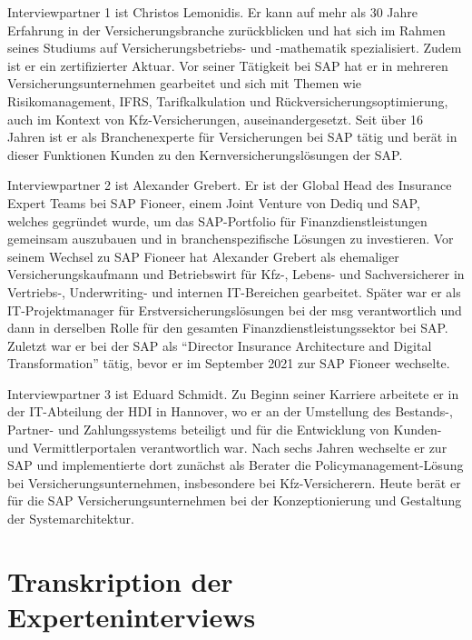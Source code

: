 Interviewpartner 1 ist Christos Lemonidis. Er kann auf mehr als 30 Jahre Erfahrung in der Versicherungsbranche zurückblicken und hat sich im Rahmen seines Studiums auf Versicherungsbetriebs- und -mathematik spezialisiert. Zudem ist er ein zertifizierter Aktuar. Vor seiner Tätigkeit bei SAP hat er in mehreren Versicherungsunternehmen gearbeitet und sich mit Themen wie Risikomanagement, IFRS, Tarifkalkulation und Rückversicherungsoptimierung, auch im Kontext von Kfz-Versicherungen, auseinandergesetzt. Seit über 16 Jahren ist er als Branchenexperte für Versicherungen bei SAP tätig und berät in dieser Funktionen Kunden zu den Kernversicherungslösungen der SAP.  

Interviewpartner 2 ist Alexander Grebert. Er ist der Global Head des Insurance Expert Teams bei SAP Fioneer, einem Joint Venture von Dediq und SAP, welches gegründet wurde, um das SAP-Portfolio für Finanzdienstleistungen gemeinsam auszubauen und in branchenspezifische Lösungen zu investieren. Vor seinem Wechsel zu SAP Fioneer hat Alexander Grebert als ehemaliger Versicherungskaufmann und Betriebswirt für Kfz-, Lebens- und Sachversicherer in Vertriebs-, Underwriting- und internen IT-Bereichen gearbeitet. Später war er als IT-Projektmanager für Erstversicherungslösungen bei der msg verantwortlich und dann in derselben Rolle für den gesamten Finanzdienstleistungssektor bei SAP. Zuletzt war er bei der SAP als \enquote{Director Insurance Architecture and Digital Transformation} tätig, bevor er im September 2021 zur SAP Fioneer wechselte.

Interviewpartner 3 ist Eduard Schmidt. Zu Beginn seiner Karriere arbeitete er in der IT-Abteilung der HDI in Hannover, wo er an der Umstellung des Bestands-, Partner- und Zahlungssystems beteiligt und für die Entwicklung von Kunden- und Vermittlerportalen verantwortlich war. Nach sechs Jahren wechselte er zur SAP und implementierte dort zunächst als Berater die Policymanagement-Lösung bei Versicherungsunternehmen, insbesondere bei Kfz-Versicherern. Heute berät er für die SAP Versicherungsunternehmen bei der Konzeptionierung und Gestaltung der Systemarchitektur.

\newpage
\section{Transkription der Experteninterviews}


